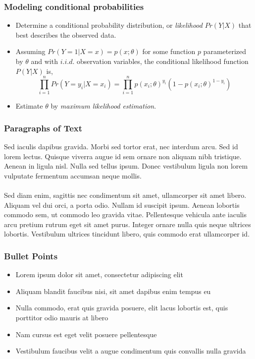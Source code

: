 \documentclass{beamer}
\begin{document}
\begin{frame}
\frametitle{Modeling conditional probabilities}
\begin{itemize}
\item Determine a conditional probability distribution, or \textit{likelihood} $Pr(Y|X)$ that best describes the observed data.
\item Assuming $Pr(Y=1|X=x) = p(x;\theta)$ for some function $p$ parameterized by $\theta$ and with $i.i.d.$ observation variables, the conditional likelihood function $P(Y|X)$ is,
\begin{equation}
\prod_{i=1}^n Pr(Y=y_i|X=x_i) = \prod_{i=1}^n p(x_i;\theta)^{y_i} (1-p(x_i;\theta)^{1-y_i})
\end{equation}
\item Estimate $\theta$ by \textit{maximum likelihood estimation}.  
\end{itemize}
\end{frame}

\begin{frame}
\frametitle{Paragraphs of Text}
Sed iaculis dapibus gravida. Morbi sed tortor erat, nec interdum arcu. Sed id lorem lectus. Quisque viverra augue id sem ornare non aliquam nibh tristique. Aenean in ligula nisl. Nulla sed tellus ipsum. Donec vestibulum ligula non lorem vulputate fermentum accumsan neque mollis.\\~\\

Sed diam enim, sagittis nec condimentum sit amet, ullamcorper sit amet libero. Aliquam vel dui orci, a porta odio. Nullam id suscipit ipsum. Aenean lobortis commodo sem, ut commodo leo gravida vitae. Pellentesque vehicula ante iaculis arcu pretium rutrum eget sit amet purus. Integer ornare nulla quis neque ultrices lobortis. Vestibulum ultrices tincidunt libero, quis commodo erat ullamcorper id.
\end{frame}


\begin{frame}
\frametitle{Bullet Points}
\begin{itemize}
\item Lorem ipsum dolor sit amet, consectetur adipiscing elit
\item Aliquam blandit faucibus nisi, sit amet dapibus enim tempus eu
\item Nulla commodo, erat quis gravida posuere, elit lacus lobortis est, quis porttitor odio mauris at libero
\item Nam cursus est eget velit posuere pellentesque
\item Vestibulum faucibus velit a augue condimentum quis convallis nulla gravida
\end{itemize}
\end{frame}
\end{document}
